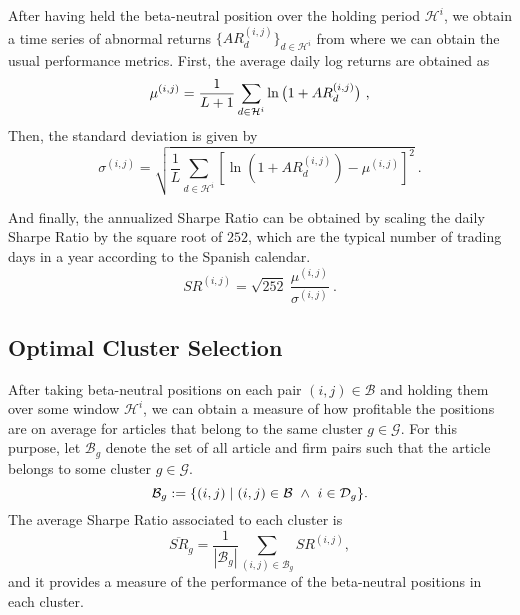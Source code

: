 \mx 

After having held the beta-neutral position over the holding period $\mathcal H^i$, we obtain a time series of abnormal returns $\{AR_{d}^{(i,j)}\}_{d\in\mathcal H^i}$ from where we can obtain the usual performance metrics. First, the average daily log returns are obtained as
$$
\mu^{(i,j)} = \frac{1}{{{L}}+1} 
\sum_{d\in \mathcal H^i}
\ln\big{(} 1+AR_d^{(i,j)} \big{)}
~,
$$
Then, the standard deviation is given by
$$
\sigma^{(i,j)}
=
\sqrt{
\frac{1}{{{L}}}
\sum_{d\in \mathcal H^i}
[
\ln(1+AR_d^{(i,j)}) - \mu^{(i,j)}
]
^2}
~.
$$

\mx 
And finally, the annualized Sharpe Ratio can be obtained by scaling the daily Sharpe Ratio by the square root of ${252}$, which are the typical number of trading days in a year according to the Spanish calendar. 
$$
SR^{(i,j)} =
\sqrt{252}~
\frac{
\mu^{(i,j)}
}{
\sigma^{(i,j)}
}
~.
$$
\subsection{Optimal Cluster Selection}

After taking beta-neutral positions on each pair $(i,j)\in\mathcal B$ and holding them over some window $\mathcal H^i$, we can obtain a measure of how profitable the positions are on average for articles that belong to the same cluster $g\in\mathcal G$. For this purpose, let $\mathcal{B}_g$ denote the set of all article and firm pairs such that the article belongs to some cluster $g\in\mathcal G$. 
$$
\mathcal{B}_g:= \{(i,j) \mid (i,j)\in\mathcal{B} ~\wedge~ i \in \mathcal{D}_g \}
.
$$
The average Sharpe Ratio associated to each cluster is
$$
\overline{S R}_g=\frac{1}{\left|\mathcal{B}_g\right|} \sum_{(i,j) \in \mathcal{B}_g} S R^{(i,j)}
,
$$
and it provides a measure of the performance of the beta-neutral positions in each cluster. 


